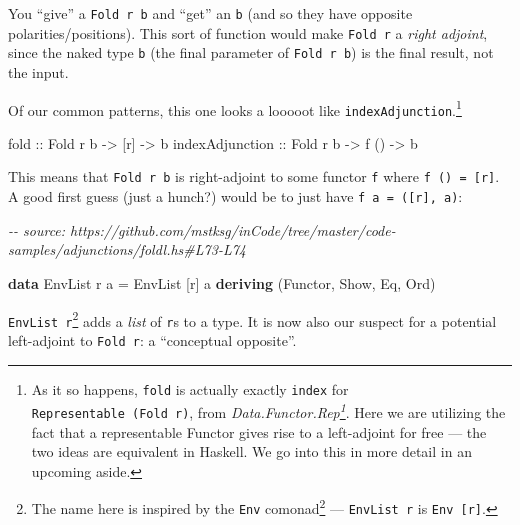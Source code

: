 \documentclass[]{article}
\newenvironment{Shaded}{}{}
\newcommand{\CommentTok}[1]{\textcolor[rgb]{0.38,0.63,0.69}{\textit{#1}}}
\newcommand{\DataTypeTok}[1]{\textcolor[rgb]{0.56,0.13,0.00}{#1}}
\newcommand{\KeywordTok}[1]{\textcolor[rgb]{0.00,0.44,0.13}{\textbf{#1}}}
\newcommand{\NormalTok}[1]{#1}
\newcommand{\OtherTok}[1]{\textcolor[rgb]{0.00,0.44,0.13}{#1}}
\renewcommand{\href}[2]{#2\footnote{\url{#1}}}
\begin{document}
You ``give'' a \texttt{Fold\ r\ b} and ``get'' an \texttt{b} (and so they have
opposite polarities/positions). This sort of function would make
\texttt{Fold\ r} a \emph{right adjoint}, since the naked type \texttt{b} (the
final parameter of \texttt{Fold\ r\ b}) is the final result, not the input.

Of our common patterns, this one looks a looooot like
\texttt{indexAdjunction}.\footnote{As it so happens, \texttt{fold} is actually
  exactly \texttt{index} for \texttt{Representable\ (Fold\ r)}, from
  \emph{\href{https://hackage.haskell.org/package/adjunctions/docs/Data-Functor-Rep.html}{Data.Functor.Rep}}.
  Here we are utilizing the fact that a representable Functor gives rise to a
  left-adjoint for free --- the two ideas are equivalent in Haskell. We go into
  this in more detail in an upcoming aside.}

\begin{Shaded}
\begin{Highlighting}[]
\OtherTok{fold            ::} \DataTypeTok{Fold}\NormalTok{ r b }\OtherTok{{-}>}\NormalTok{ [r]  }\OtherTok{{-}>}\NormalTok{ b}
\OtherTok{indexAdjunction ::} \DataTypeTok{Fold}\NormalTok{ r b }\OtherTok{{-}>}\NormalTok{ f () }\OtherTok{{-}>}\NormalTok{ b}
\end{Highlighting}
\end{Shaded}

This means that \texttt{Fold\ r\ b} is right-adjoint to some functor \texttt{f}
where \texttt{f\ ()\ =\ {[}r{]}}. A good first guess (just a hunch?) would be to
just have \texttt{f\ a\ =\ ({[}r{]},\ a)}:

\begin{Shaded}
\begin{Highlighting}[]
\CommentTok{{-}{-} source: https://github.com/mstksg/inCode/tree/master/code{-}samples/adjunctions/foldl.hs\#L73{-}L74}

\KeywordTok{data} \DataTypeTok{EnvList}\NormalTok{ r a }\OtherTok{=} \DataTypeTok{EnvList}\NormalTok{ [r] a}
  \KeywordTok{deriving}\NormalTok{ (}\DataTypeTok{Functor}\NormalTok{, }\DataTypeTok{Show}\NormalTok{, }\DataTypeTok{Eq}\NormalTok{, }\DataTypeTok{Ord}\NormalTok{)}
\end{Highlighting}
\end{Shaded}

\texttt{EnvList\ r}\footnote{The name here is inspired by the
  \href{https://hackage.haskell.org/package/comonad/docs/Control-Comonad-Trans-Env.html}{\texttt{Env}
  comonad} --- \texttt{EnvList\ r} is \texttt{Env\ {[}r{]}}.} adds a \emph{list}
of \texttt{r}s to a type. It is now also our suspect for a potential
left-adjoint to \texttt{Fold\ r}: a ``conceptual opposite''.
\end{document}
